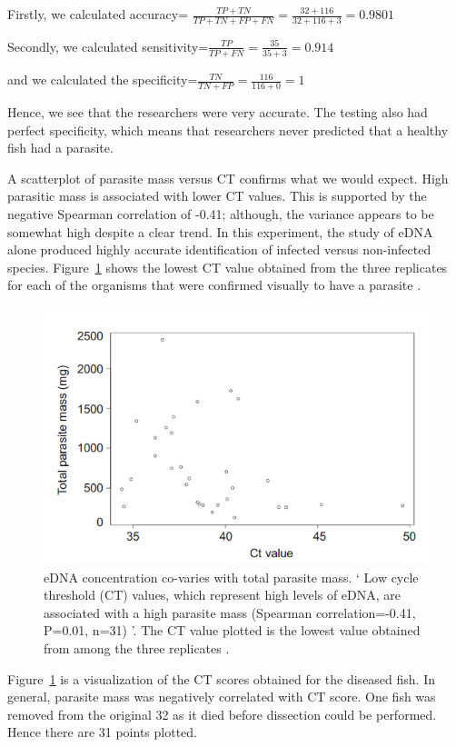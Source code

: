 \vspace{5mm}

Firstly, we calculated accuracy= $\frac{TP+TN}{TP+TN+FP+FN}=\frac{32+116}{32+116+3}=0.9801$

Secondly, we calculated sensitivity=$\frac{TP}{TP+FN}=\frac{35}{35+3}=0.914$

and we calculated the specificity=$\frac{TN}{TN+FP}=\frac{116}{116+0}=1$

\vspace{5mm}

Hence, we see that the researchers were very accurate. The testing also had perfect specificity, which means that researchers never predicted that a healthy fish had a parasite.



\newpage

A scatterplot of parasite mass versus CT confirms what we would expect. High parasitic mass is associated with lower CT values. This is supported by the negative Spearman correlation of -0.41; although, the variance appears to be somewhat high despite a clear trend. In this experiment, the study of eDNA alone produced highly accurate identification of infected versus non-infected species. Figure~\ref{fig:parasite} shows the lowest CT value obtained from the three replicates for each of the organisms that were confirmed visually to have a parasite \citep{parasite}.



\begin{figure}[H]
\includegraphics{Chapter2Images/parasitect.png} 
\caption{eDNA concentration co-varies with total parasite mass. ` Low cycle threshold (CT) values, which represent high levels of eDNA, are associated with a high parasite mass (Spearman correlation=-0.41, P=0.01, n=31) '.  The CT value plotted is the lowest value obtained from among the three replicates \citep{parasite}.}
\label{fig:parasite}
\end{figure}

Figure~\ref{fig:parasite} is a visualization of the CT scores obtained for the diseased fish. In general, parasite mass was negatively correlated with CT score. One fish was removed from the original 32 as it died before dissection could be performed. Hence there are 31 points plotted.





